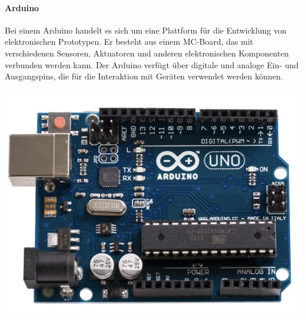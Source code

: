 \begin{minipage}{0.7\textwidth}
	\paragraph{Arduino}
	Bei einem Arduino handelt es sich um eine Plattform für die Entwicklung von elektronischen Prototypen. %
	Er besteht aus einem \ac{MC}-Board, das mit verschiedenen Sensoren, Aktuatoren und anderen elektronischen Komponenten verbunden werden kann.
	Der Arduino verfügt über digitale und analoge Ein- und Ausgangspins, die für die Interaktion mit Geräten verwendet werden können.
\end{minipage}
\begin{minipage}{0.3\textwidth}
	\includegraphics [width=\textwidth] {img/ArduinoR3}
\end{minipage}
\newline


